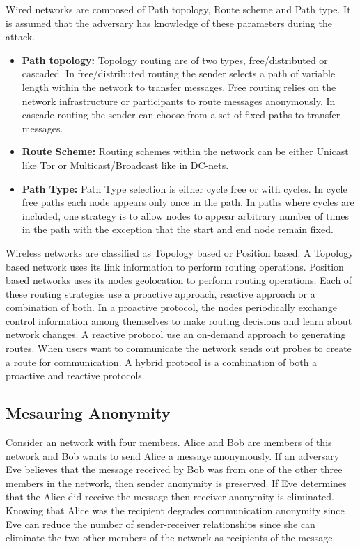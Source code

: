 \documentclass{llncs}
\begin{document}
Wired networks are composed of Path topology, Route scheme and Path type. It is assumed that the adversary has knowledge of these parameters during the attack. 
\begin{itemize}
	\item[]{\textbf{Path topology:} Topology routing are of two types, free/distributed or cascaded. In free/distributed routing the sender selects a path of variable length within the network to transfer messages. Free routing relies on the network infrastructure or participants to route messages anonymously. In cascade routing the sender can choose from a set of fixed paths to transfer messages.}
	\item[]{\textbf{Route Scheme:} Routing schemes within the network can be either Unicast like Tor or Multicast/Broadcast like in DC-nets. }
	\item[]{\textbf{Path Type:} Path Type selection is either cycle free or with cycles. In cycle free paths each node appears only once in the path. In paths where cycles are included, one strategy is to allow nodes to appear arbitrary number of times in the path with the exception that the start and end node remain fixed.}
\end{itemize}

Wireless networks are classified as Topology based or Position based. A Topology based network uses its link information to perform routing operations. Position based networks uses its nodes geolocation to perform routing operations. Each of these routing strategies use a proactive approach, reactive approach or a combination of both. In a proactive protocol, the nodes periodically exchange control information among themselves to make routing decisions and learn about network changes. A reactive protocol use an on-demand approach to generating routes. When users want to communicate the network sends out probes to create a route for communication. A hybrid protocol is a combination of both a proactive and reactive protocols.

\subsection{Mesauring Anonymity}
Consider an network with four members. Alice and Bob are members of this network and Bob wants to send Alice a message anonymously. If an adversary Eve believes that the message received by Bob was from one of the other three members in the network, then sender anonymity is preserved. If Eve determines that the Alice did receive the message then receiver anonymity is eliminated. Knowing that Alice was the recipient degrades communication anonymity since Eve can reduce the number of sender-receiver relationships since she can eliminate the two other members of the network as recipients of the message.
\end{document}
